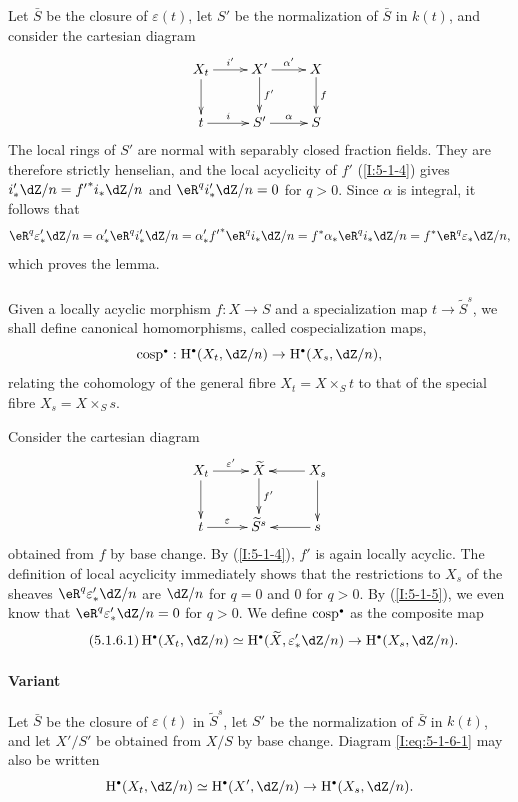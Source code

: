 Let $\bar S$ be the closure of $\varepsilon(t)$, let $S'$ be the
normalization of $\bar S$ in $k(t)$, and consider the cartesian diagram
\[\xymatrix{
  X_t \ar[r]^-{i'} \ar[d]
    & X' \ar[r]^-{\alpha'} \ar[d]^-{f'}
    & X \ar[d]^-f \\
  t \ar[r]^-i
    & S' \ar[r]^-\alpha
    & S
}\]
The local rings of $S'$ are normal with separably closed fraction fields.
They are therefore strictly henselian, and the local acyclicity of $f'$
(\ref{I:5-1-4}) gives
$i'_*\dZ/n={f'}^*i_*\dZ/n$ and $\eR^q i'_*\dZ/n=0$ for $q>0$. Since $\alpha$
is integral, it follows that
\[
  \eR^q\varepsilon_*'\dZ/n
    = \alpha_*' \eR^q i_*' \dZ/n
    = \alpha_*' {f'}^* \eR^q i_* \dZ/n
    = f^* \alpha_* \eR^q i_* \dZ/n
    = f^* \eR^q \varepsilon_* \dZ/n \text{,}
\]
which proves the lemma.

\subsubsection{}\label{I:5-1-6}

Given a locally acyclic morphism $f:X\to S$ and a specialization map
$t\to\widetilde S^s$, we shall define canonical homomorphisms, called
cospecialization maps,
\[
  \cosp^\bullet : \h^\bullet(X_t,\dZ/n) \to \h^\bullet(X_s,\dZ/n)\text{,}
\]
relating the cohomology of the general fibre $X_t=X\times_St$ to that of
the special fibre $X_s=X\times_Ss$.

Consider the cartesian diagram
\[\xymatrix{
  X_t \ar[d] \ar[r]^-{\varepsilon'}
    & \widetilde X \ar[d]^-{f'}
    & \ar[l] X_s \ar[d] \\
  t \ar[r]^-\varepsilon
    & \widetilde S^s
    & \ar[l] s
}\]
obtained from $f$ by base change. By (\ref{I:5-1-4}), $f'$ is again
locally acyclic. The definition of local acyclicity immediately shows that
the restrictions to $X_s$ of the sheaves $\eR^q\varepsilon_*'\dZ/n$ are
$\dZ/n$ for $q=0$ and $0$ for $q>0$. By (\ref{I:5-1-5}), we even know
that $\eR^q\varepsilon_*'\dZ/n=0$ for $q>0$. We define
$\cosp^\bullet$ as the composite map
\begin{equation*}\tag{5.1.6.1}\label{I:eq:5-1-6-1}
  \h^\bullet(X_t,\dZ/n) \simeq \h^\bullet(\widetilde X,\varepsilon_*' \dZ/n) \to \h^\bullet(X_s,\dZ/n) \text{.}
\end{equation*}

\paragraph{Variant}
Let $\bar S$ be the closure of $\varepsilon(t)$ in
$\widetilde S^s$, let $S'$ be the normalization of $\bar S$ in $k(t)$,
and let $X'/S'$ be obtained from $X/S$ by base change. Diagram
\eqref{I:eq:5-1-6-1} may also be written
\[
  \h^\bullet(X_t,\dZ/n) \simeq \h^\bullet(X',\dZ/n) \to \h^\bullet(X_s,\dZ/n) \text{.}
\]

